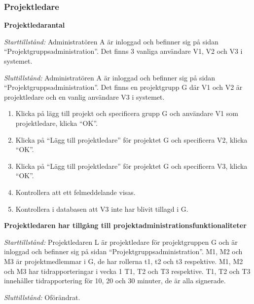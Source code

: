 \documentclass[a4paper]{article}
\begin{document}
\subsubsection{Projektledare}
\begin{FT}
\item \textbf{Projektledarantal}

\emph{Starttillstånd:} Administratören A är inloggad och befinner sig på sidan ``Projektgruppsadministration''. Det finns 3 vanliga användare V1, V2 och V3 i systemet.

\emph{Sluttillstånd:} Administratören A är inloggad och befinner sig på sidan ``Projektgruppsadministration''. Det finns en projektgrupp G där V1 och V2 är projektledare och en vanlig användare V3 i systemet.

\begin{enumerate}
\item Klicka på lägg till projekt och specificera grupp G och användare V1 som projektledare, klicka ``OK''.
\item Klicka på ``Lägg till projektledare'' för projektet G och specificera V2, klicka ``OK''.
\item Klicka på ``Lägg till projektledare'' för projektet G och specificera V3, klicka ``OK''.
\item Kontrollera att ett felmeddelande visas.
\item Kontrollera i databasen att V3 inte har blivit tillagd i G.
\end{enumerate}

\item \textbf{Projektledaren har tillgång till projektadministrationsfunktionaliteter}

\emph{Starttillstånd:} Projektledaren L är projektledare för projektgruppen G och är inloggad och befinner sig på sidan ``Projektgruppsadministration''. M1, M2 och M3 är projektmedlemmar i G, de har rollerna t1, t2 och t3 respektive. M1, M2 och M3 har tidrapporteringar i vecka 1 T1, T2 och T3 respektive. T1, T2 och T3 innehåller tidrapportering för 10, 20 och 30 minuter, de är alla signerade.

\emph{Sluttillstånd:} Oförändrat.


\end{FT}
\end{document}
